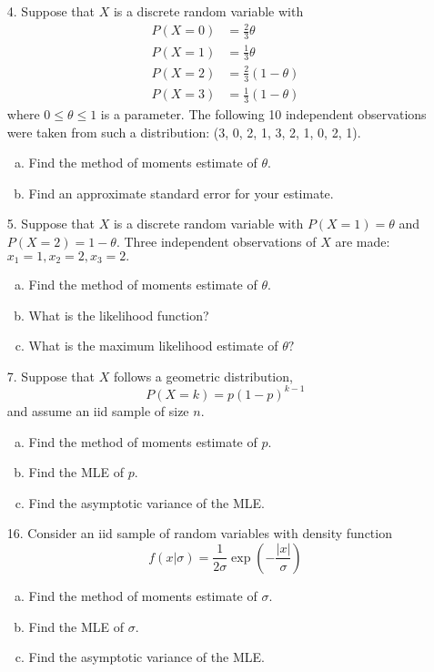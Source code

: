 \documentclass{article}
\begin{document}
\begin{itemize}
	\item[4.] Suppose that $X$ is a discrete random variable with 
				\begin{align*}
					P(X=0)&=\frac{2}{3}\theta \\
					P(X=1) &= \frac{1}{3}\theta \\
					P(X=2) &= \frac{2}{3}(1-\theta) \\
					P(X=3) &= \frac{1}{3}(1-\theta)
				\end{align*}
				where $0\le\theta\le1$ is a parameter. The following 10 independent observations were taken from such a distribution: (3, 0, 2, 1, 3, 2, 1, 0, 2, 1).
		\begin{enumerate}[(a)]
			\item Find the method of moments estimate of $\theta.$

			\item Find an approximate standard error for your estimate.

		\end{enumerate}

	\item[5.] Suppose that $X$ is a discrete random variable with $P(X=1)=\theta$ and $P(X=2)=1-\theta.$ Three independent observations of $X$ are made: $x_1=1, x_2=2, x_3=2.$
		\begin{enumerate}[(a)]
			\item Find the method of moments estimate of $\theta.$

			\item  What is the likelihood function?

			\item What is the maximum likelihood estimate of $\theta?$
				
		\end{enumerate}

	\item[7.] Suppose that $X$ follows a geometric distribution, \[P(X=k)=p(1-p)^{k-1}\] and assume an iid sample of size $n.$
		\begin{enumerate}[(a)]
			\item Find the method of moments estimate of $p.$

			\item Find the MLE of $p.$

			\item Find the asymptotic variance of the MLE.
				
		\end{enumerate}

	\item[16.] Consider an iid sample of random variables with density function \[f(x|\sigma) = \frac{1}{2\sigma}\exp{\left( -\frac{|x|}{\sigma} \right)}\]
		\begin{enumerate}[(a)]
			\item Find the method of moments estimate of $\sigma.$

			\item Find the MLE of $\sigma.$

			\item Find the asymptotic variance of the MLE.
				
		\end{enumerate}
\end{itemize}
\end{document}
